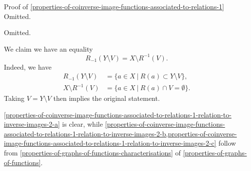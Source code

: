\begin{Proof}{Proof of \cref{properties-of-coinverse-image-functions-associated-to-relations-1}}
    Omitted.

    Omitted.

    We claim we have an equality
    \[
        R_{-1}(Y\setminus V)%
        =%
        X\setminus R^{-1}(V).%
    \]%
    Indeed, we have
    \begin{align*}
        R_{-1}(Y\setminus V) &= \{a\in X\ |\ R(a)\subset Y\setminus V\},\\%
        X\setminus R^{-1}(V) &= \{a\in X\ |\ R(a)\cap V=\emptyset\}.%
    \end{align*}
    Taking $V=Y\setminus V$ then implies the original statement.

    \cref{properties-of-coinverse-image-functions-associated-to-relations-1-relation-to-inverse-images-2-a} is clear, while \cref{properties-of-coinverse-image-functions-associated-to-relations-1-relation-to-inverse-images-2-b,properties-of-coinverse-image-functions-associated-to-relations-1-relation-to-inverse-images-2-c} follow from \cref{properties-of-graphs-of-functions-characterisations} of \cref{properties-of-graphs-of-functions}.
\end{Proof}
